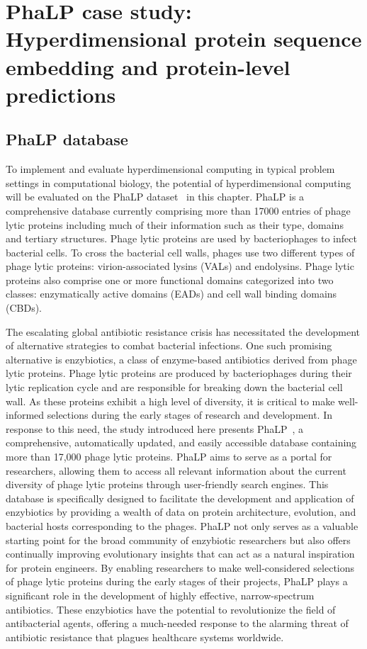 \chapter{PhaLP case study:\\Hyperdimensional protein sequence embedding and protein-level predictions}
\section{PhaLP database}
To implement and evaluate hyperdimensional computing in typical problem settings in computational biology, the potential of hyperdimensional computing will be evaluated on the PhaLP dataset~\cite{phalp} in this chapter. PhaLP is a comprehensive database currently comprising more than 17000 entries of phage lytic proteins including much of their information such as their type, domains and tertiary structures. Phage lytic proteins are used by bacteriophages to infect bacterial cells. To cross the bacterial cell walls, phages use two different types of phage lytic proteins: virion-associated lysins (VALs) and endolysins. Phage lytic proteins also comprise one or more functional domains categorized into two classes: enzymatically active domains (EADs) and cell wall binding domains (CBDs).

The escalating global antibiotic resistance crisis has necessitated the development of alternative strategies to combat bacterial infections. One such promising alternative is enzybiotics, a class of enzyme-based antibiotics derived from phage lytic proteins. Phage lytic proteins are produced by bacteriophages during their lytic replication cycle and are responsible for breaking down the bacterial cell wall. As these proteins exhibit a high level of diversity, it is critical to make well-informed selections during the early stages of research and development. In response to this need, the study introduced here presents PhaLP~\cite{phalp}, a comprehensive, automatically updated, and easily accessible database containing more than 17,000 phage lytic proteins. PhaLP aims to serve as a portal for researchers, allowing them to access all relevant information about the current diversity of phage lytic proteins through user-friendly search engines. This database is specifically designed to facilitate the development and application of enzybiotics by providing a wealth of data on protein architecture, evolution, and bacterial hosts corresponding to the phages. PhaLP not only serves as a valuable starting point for the broad community of enzybiotic researchers but also offers continually improving evolutionary insights that can act as a natural inspiration for protein engineers. By enabling researchers to make well-considered selections of phage lytic proteins during the early stages of their projects, PhaLP plays a significant role in the development of highly effective, narrow-spectrum antibiotics. These enzybiotics have the potential to revolutionize the field of antibacterial agents, offering a much-needed response to the alarming threat of antibiotic resistance that plagues healthcare systems worldwide.

